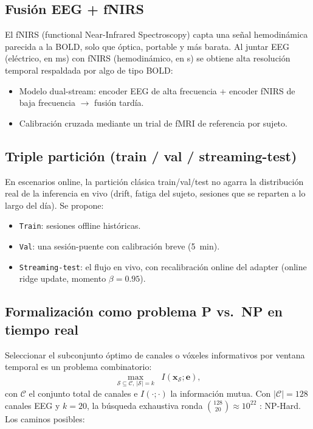 \subsection{Fusión EEG + fNIRS}

El fNIRS (functional Near-Infrared Spectroscopy) capta una señal hemodinámica parecida a la 
BOLD, solo que óptica, portable y más barata. Al juntar EEG (eléctrico, en ms) con fNIRS 
(hemodinámico, en s) se obtiene alta resolución temporal respaldada por algo de tipo BOLD:

\begin{itemize}
\item[•] Modelo dual-stream: encoder EEG de alta frecuencia + encoder fNIRS de baja frecuencia 
$\rightarrow$ fusión tardía.
\item[•] Calibración cruzada mediante un trial de fMRI de referencia por sujeto.
\end{itemize}

\subsection{Triple partición (train / val / streaming-test)}

En escenarios online, la partición clásica train/val/test no agarra la
distribución real de la inferencia en vivo (drift, fatiga del sujeto, sesiones que se
reparten a lo largo del día). Se propone:

\begin{itemize}
\item[•] \texttt{Train}: sesiones offline históricas.
\item[•] \texttt{Val}: una sesión-puente con calibración breve (5~min).
\item[•] \texttt{Streaming-test}: el flujo en vivo, con recalibración online del adapter (online ridge 
update, momento $\beta=0.95$).
\end{itemize}

\subsection{Formalización como problema P vs.\ NP en tiempo real}

Seleccionar el subconjunto óptimo de canales o vóxeles informativos por ventana temporal es un 
problema combinatorio:
\begin{equation}
\max_{\mathcal{S} \subseteq \mathcal{C},\, |\mathcal{S}|=k} \;\; I(\mathbf{x}_\mathcal{S}; \mathbf{e}),
\end{equation}
con $\mathcal{C}$ el conjunto total de canales e $I(\cdot;\cdot)$ la información mutua. Con 
$|\mathcal{C}|=128$ canales EEG y $k=20$, la búsqueda exhaustiva ronda $\binom{128}{20} \approx 10^{22}$
: NP-Hard. Los caminos posibles:

